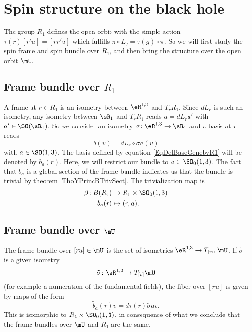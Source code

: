 \section{Spin structure on the black hole}

The group $R_1$ defines the open orbit with the simple action $\tau(r)[r'u]=[rr'u]$ which fulfills $\pi\circ L_g=\tau(g)\circ\pi$. So we will first study the spin frame and spin bundle over $R_1$, and then bring the structure over the open orbit $\mU$.

\subsection{Frame bundle over \texorpdfstring{$R_1$}{R1}}

A frame at $r\in R_1$ is an isometry between $\eR^{1,3}$ and $T_rR_1$. Since $dL_r$ is such an isometry, any isometry between $\sR_1$ and $T_rR_1$ reads $a=dL_ra'$ with $a'\in\SO(\sR_1)$. So we consider an isometry $\sigma\colon \eR^{1,3}\to \sR_1$ and a basis at $r$ reads
\begin{equation}   \label{EqDefBaseGenebvR1}
    b(v)=dL_r\circ\sigma a(v)
\end{equation}
with $a\in \SO(1,3)$. The basis defined by equation \eqref{EqDefBaseGenebvR1} will be denoted by $b_a(r)$. Here, we will restrict our bundle to $a\in \SO_0(1,3)$. The fact that $b_a$ is a global section of the frame bundle indicates us that the bundle is trivial by theorem \ref{ThoYPrincBTrivSect}. The trivialization map is 
\begin{equation}
\begin{aligned}
 \beta\colon B(R_1)&\to R_1\times \SO_0(1,3) \\ 
b_a(r)&\mapsto (r,a). 
\end{aligned}
\end{equation}


\subsection{Frame bundle over \texorpdfstring{$\mU$}{U}}

The frame bundle over $[ru]\in \mU$ is the set of isometries $\eR^{1,3}\to T_{[ru]}\mU$. If $\tilde\sigma$ is a given isometry 
\[ 
  \tilde\sigma\colon \eR^{1,3}\to T_{[u]}\mU
\]
(for example a numeration of the fundamental fields), the fiber over $[ru]$ is given by maps of the form
\begin{equation}
\tilde b_a(r)v=d\tau(r)\tilde\sigma av.
\end{equation}
This is isomorphic to $R_1\times\SO_0(1,3)$, in consequence of what we conclude that the frame bundles over $\mU$ and $R_1$ are the same.
